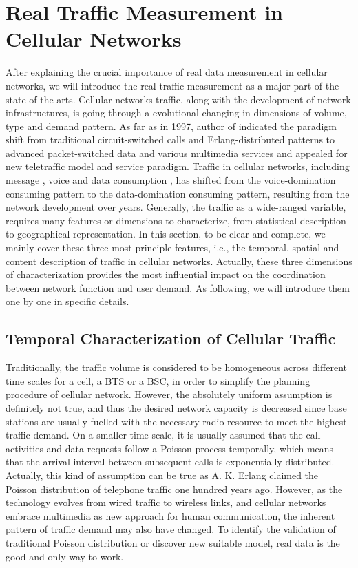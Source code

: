 \section{Real Traffic Measurement in Cellular Networks}
After explaining the crucial importance of real data measurement in cellular networks, we will introduce the real traffic measurement as a major part of the state of the arts. Cellular networks traffic, along with the development of network infrastructures, is going through a evolutional changing in dimensions of volume, type and demand pattern. As far as in 1997, author of \cite{wirth1997role} indicated the paradigm shift from traditional circuit-switched calls and Erlang-distributed patterns to advanced packet-switched data and various multimedia services and appealed for new teletraffic model and service paradigm. Traffic in cellular networks, including message \cite{zerfos2006study}, voice \cite{willkomm2008primary} and data consumption \cite{shafiq2011characterizing}, has shifted from the voice-domination consuming pattern to the data-domination consuming pattern, resulting from the network development over years. Generally, the traffic as a wide-ranged variable, requires many features or dimensions to characterize, from statistical description to geographical representation. In this section, to be clear and complete, we mainly cover these three most principle features, i.e., the temporal, spatial and content description of traffic in cellular networks. Actually, these three dimensions of characterization provides the most influential impact on the coordination between network function and user demand. As following, we will introduce them one by one in specific details.

\subsection{Temporal Characterization of Cellular Traffic}
Traditionally, the traffic volume is considered to be homogeneous across different time scales for a cell, a BTS or a BSC, in order to simplify the planning procedure of cellular network. However, the absolutely uniform assumption is definitely not true, and thus the desired network capacity is decreased since base stations are usually fuelled with the necessary radio resource to meet the highest traffic demand. On a smaller time scale, it is usually assumed that the call activities and data requests follow a Poisson process temporally, which means that the arrival interval between subsequent calls is exponentially distributed. Actually, this kind of assumption can be true as A. K. Erlang claimed the Poisson distribution of telephone traffic one hundred years ago. However, as the technology evolves from wired traffic to wireless links, and cellular networks embrace multimedia as new approach for human communication, the inherent pattern of traffic demand may also have changed. To identify the validation of traditional Poisson distribution or discover new suitable model, real data is the good and only way to work.

